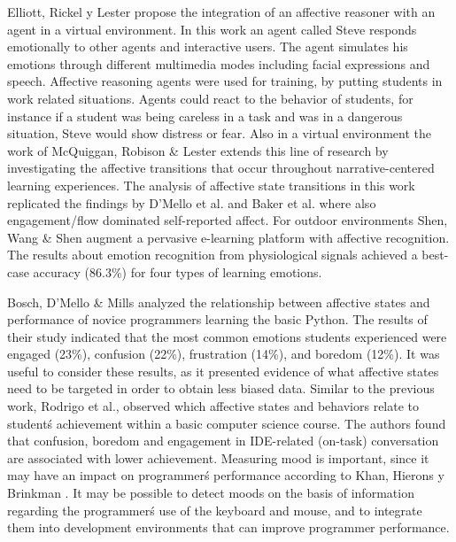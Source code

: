 \documentclass[a4paper,twoside]{article}
\begin{document}
Elliott, Rickel y Lester \cite{elliott1999lifelike,d2008autotutor} propose the integration of an affective reasoner
with an agent in a virtual environment. In this work an agent called Steve
responds emotionally to other agents and interactive users. The agent simulates
his emotions through different multimedia modes including facial expressions and
speech. Affective reasoning agents were used for training, by putting students
in work related situations. Agents could react to the behavior of students, for
instance if a student was being careless in a task and was in a dangerous
situation, Steve would show distress or fear. Also in a virtual environment the
work of McQuiggan, Robison \& Lester \cite{mcquiggan2010affective} extends this line of research by
investigating the affective transitions that occur throughout narrative-centered
learning experiences. The analysis of affective state transitions in this work
replicated the findings by D’Mello et al. \cite{d2008autotutor} and Baker et al.
\cite{rodrigo2009affective} where
also engagement/flow dominated self-reported affect. For outdoor environments
Shen, Wang \& Shen \cite{shen2009affective} augment a pervasive e-learning platform with affective
recognition.  The results about emotion recognition from physiological signals
achieved a best-case accuracy (86.3\%) for four types of learning emotions.

Bosch, D'Mello \& Mills \cite{bosch2013emotions} analyzed the relationship between affective states
and performance of novice programmers learning the basic Python. The results of their study
indicated that the most common emotions students experienced were engaged
(23\%), confusion (22\%), frustration (14\%), and boredom (12\%). It was useful
to consider these results, as it presented evidence of what affective states
need to be targeted in order to obtain less biased data. Similar to
the previous work, Rodrigo et al., \cite{rodrigo2009affective} observed which affective states and
behaviors relate to student\'s achievement within a basic computer science
course. The authors found that confusion, boredom and engagement in IDE-related
(on-task) conversation are associated with lower achievement. Measuring mood is important,
since it may have an impact on programmer\'s performance according
to Khan, Hierons y Brinkman \cite{khan2007mood}. It may be possible to detect moods
on the basis of information regarding the programmer\'s use of the keyboard and
mouse, and to integrate them into development environments that can improve
programmer performance.
\end{document}
